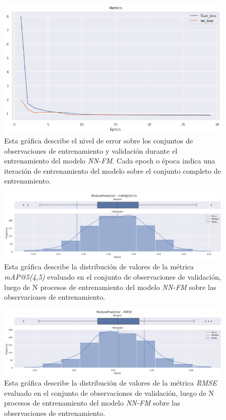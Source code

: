 \documentclass[11pt,a4paper,twoside]{thesis}
\begin{document}
\begin{figure}[h!]
	\centering
	\includegraphics[width=13cm]{./images/metrics-NN-FM-train-val-loss.png}
	\caption{Esta gráfica describe el nivel de error sobre los
		conjuntos de observaciones de entrenamiento y validación durante
		el entrenamiento del modelo \textit{NN-FM}. Cada epoch o época
		indica una iteración de entrenamiento del modelo sobre el conjunto
		completo de entrenamiento.}
\end{figure}

\clearpage

\begin{figure}[h!]
	\centering
	\includegraphics[width=15cm]{./images/metrics-NN-FM-mapk.png}
	\caption{Esta gráfica describe la distribución de valores de la
		métrica \textit{mAP@5(4,5)} evaluado en el conjunto de
		observaciones de validación, luego de N procesos de
		entrenamiento del modelo \textit{NN-FM} sobre las observaciones
		de entrenamiento.}
\end{figure}

\begin{figure}[h!]
	\centering
	\includegraphics[width=15cm]{./images/metrics-NN-FM-RMSE.png}
	\caption{Esta gráfica describe la distribución de valores de la
		métrica \textit{RMSE} evaluado en el conjunto de observaciones
		de validación, luego de N procesos de entrenamiento del
		modelo \textit{NN-FM} sobre las observaciones de entrenamiento.}
\end{figure}
\end{document}
